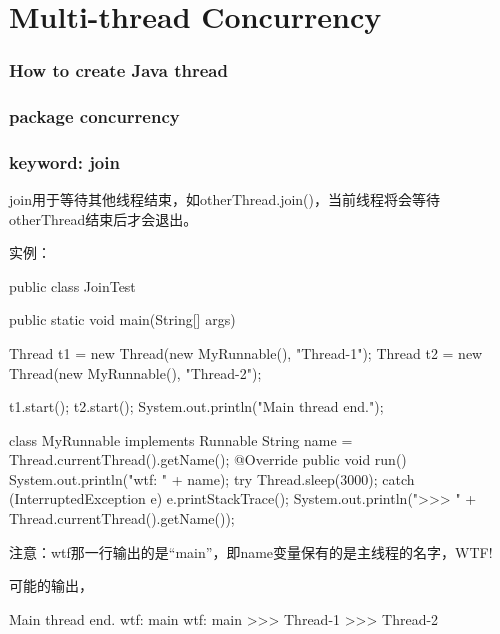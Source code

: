 \documentclass[a4paper,11pt]{article}
\begin{document}
\tt %
\pagestyle{header}
\sybmaketitle
\tableofcontents
\newpage

\pagestyle{main}
\setcounter{page}{1}

\part[Multi-thread and Concurrency]{Multi-thread Concurrency}
\section[How to create Java thread]{How to create Java thread}

\section[package: concurrency]{package concurrency}

\section[keyword: join]{keyword: join}
join用于等待其他线程结束，如otherThread.join()，当前线程将会等待
otherThread结束后才会退出。

实例：

\begin{javacode}
public class JoinTest {
  public static void main(String[] args) {
    Thread t1 = new Thread(new MyRunnable(), "Thread-1");
    Thread t2 = new Thread(new MyRunnable(), "Thread-2");
    
    t1.start();
    t2.start();
    System.out.println("Main thread end.");
  }
}

class MyRunnable implements Runnable {
  String name = Thread.currentThread().getName();
  @Override
  public void run() {
    System.out.println("wtf: " + name);
    try {
      Thread.sleep(3000);
    } catch (InterruptedException e) {
      e.printStackTrace();
    }
    System.out.println(">>> " + Thread.currentThread().getName());
  }
}
\end{javacode}

注意：wtf那一行输出的是“main”，即name变量保有的是主线程的名字，WTF!

可能的输出，

\begin{bashcode}
Main thread end.
wtf: main
wtf: main
>>> Thread-1
>>> Thread-2
\end{bashcode}
\end{document}
